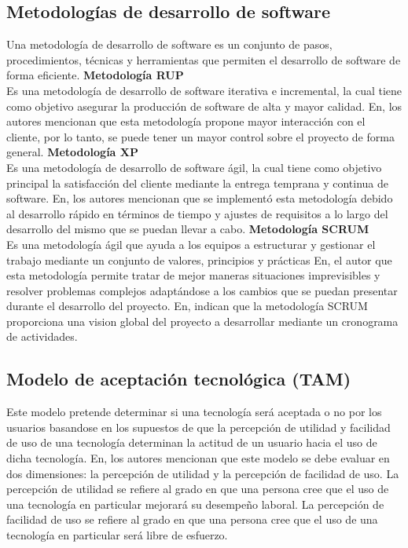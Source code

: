 \subsection{Metodologías de desarrollo de software}
Una metodología de desarrollo de software es un conjunto de pasos, procedimientos, técnicas y herramientas que permiten el desarrollo de software de forma eficiente.
\bigbreak
\textbf {Metodología RUP} \\
Es una metodología de desarrollo de software iterativa e incremental, la cual tiene como objetivo asegurar la producción de software de alta y mayor calidad. En\cite{moscayzaSistemaWebPara}, los autores mencionan que esta metodología propone mayor interacción con el cliente, por lo tanto, se puede tener un mayor control sobre el proyecto de forma general.
\bigbreak
\textbf{Metodología XP} \\
Es una metodología de desarrollo de software ágil, la cual tiene como objetivo principal la satisfacción del cliente mediante la entrega temprana y continua de software. En\cite{ortegaAnalisisDisenoImplementacion2017}, los autores mencionan que se implementó esta metodología debido al desarrollo rápido en términos de tiempo y ajustes de requisitos a lo largo del desarrollo del mismo que se puedan llevar a cabo.
\bigbreak
\textbf{Metodología SCRUM} \\
Es una metodología ágil que ayuda a los equipos a estructurar y gestionar el trabajo mediante un conjunto de valores, principios y prácticas
En\cite{moreiraDESARROLLOSISTEMAWEB2019}, el autor que esta metodología permite tratar de mejor maneras situaciones imprevisibles y resolver problemas complejos adaptándose a los cambios que se puedan presentar durante el desarrollo del proyecto. En\cite{castroReconocimientoFacialGeolocalizacion2023}, indican que la metodología SCRUM proporciona una vision global del proyecto a desarrollar mediante un cronograma de actividades.

\subsection{Modelo de aceptación tecnológica (TAM)}

Este modelo pretende determinar si una tecnología será aceptada o no por los usuarios basandose en los supuestos de que la percepción de utilidad y facilidad de uso de una tecnología determinan la actitud de un usuario hacia el uso de dicha tecnología. En\cite{tam}, los autores mencionan que este modelo se debe evaluar en dos dimensiones: la percepción de utilidad y la percepción de facilidad de uso. La percepción de utilidad se refiere al grado en que una persona cree que el uso de una tecnología en particular mejorará su desempeño laboral. La percepción de facilidad de uso se refiere al grado en que una persona cree que el uso de una tecnología en particular será libre de esfuerzo.

